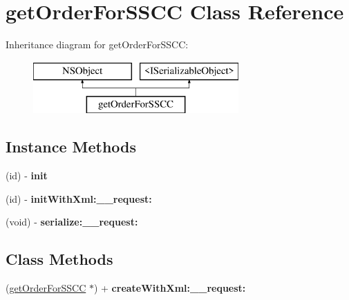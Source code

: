 \hypertarget{interfaceget_order_for_s_s_c_c}{}\section{get\+Order\+For\+S\+S\+C\+C Class Reference}
\label{interfaceget_order_for_s_s_c_c}
Inheritance diagram for get\+Order\+For\+S\+S\+C\+C\+:\begin{figure}[H]
\begin{center}
\leavevmode
\includegraphics[height=2.000000cm]{interfaceget_order_for_s_s_c_c}
\end{center}
\end{figure}
\subsection*{Instance Methods}
\begin{DoxyCompactItemize}
\item 
\hypertarget{interfaceget_order_for_s_s_c_c_a3458b806956323286b6db1ccc0946871}{}(id) -\/ {\bfseries init}\label{interfaceget_order_for_s_s_c_c_a3458b806956323286b6db1ccc0946871}

\item 
\hypertarget{interfaceget_order_for_s_s_c_c_af9efb85a12a6827ab24187d7ffddd6e2}{}(id) -\/ {\bfseries init\+With\+Xml\+:\+\_\+\+\_\+request\+:}\label{interfaceget_order_for_s_s_c_c_af9efb85a12a6827ab24187d7ffddd6e2}

\item 
\hypertarget{interfaceget_order_for_s_s_c_c_a813f96f5ae75e36a4d716a652762c6f4}{}(void) -\/ {\bfseries serialize\+:\+\_\+\+\_\+request\+:}\label{interfaceget_order_for_s_s_c_c_a813f96f5ae75e36a4d716a652762c6f4}

\end{DoxyCompactItemize}
\subsection*{Class Methods}
\begin{DoxyCompactItemize}
\item 
\hypertarget{interfaceget_order_for_s_s_c_c_a127467930148abccea5578c38755716f}{}(\hyperlink{interfaceget_order_for_s_s_c_c}{get\+Order\+For\+S\+S\+C\+C} $\ast$) + {\bfseries create\+With\+Xml\+:\+\_\+\+\_\+request\+:}\label{interfaceget_order_for_s_s_c_c_a127467930148abccea5578c38755716f}

\end{DoxyCompactItemize}
